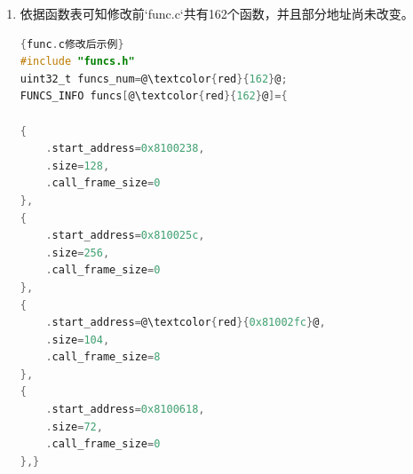 \documentclass[12pt,a4paper]{ctexart}
\numberwithin{figure}{section}
\begin{document}
\begin{enumerate}
\begin{enumerate}
\begin{figure}
                        \label{gl}
                    \end{figure}
              \item 依据函数表可知修改前`func.c`共有162个函数，并且部分地址尚未改变。
                    \begin{lstlisting}[language=C]{func.c修改后示例}
#include "funcs.h"
uint32_t funcs_num=@\textcolor{red}{162}@;
FUNCS_INFO funcs[@\textcolor{red}{162}@]={

{
    .start_address=0x8100238,
    .size=128,
    .call_frame_size=0
},
{
    .start_address=0x810025c,
    .size=256,
    .call_frame_size=0
},
{
    .start_address=@\textcolor{red}{0x81002fc}@,
    .size=104,
    .call_frame_size=8
},
{
    .start_address=0x8100618,
    .size=72,
    .call_frame_size=0
},}
                                         \end{lstlisting}
                    

\end{enumerate}
\end{enumerate}
\end{document}
